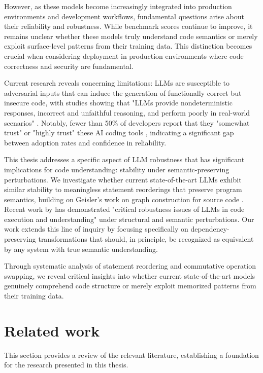\documentclass[%
thesis=student,%
coverpage=false,%
titlepage=false,%
headmarks=true, %
english,%
font=libertine, %
math=newpxtx, %
BCOR=5mm,%
coverBCOR=11mm%
]{tum-templates/book/tumbook}
\begin{document}
However, as these models become increasingly integrated into production environments and development workflows, fundamental questions arise about their reliability and robustness. While benchmark scores continue to improve, it remains unclear whether these models truly understand code semantics or merely exploit surface-level patterns from their training data. This distinction becomes crucial when considering deployment in production environments where code correctness and security are fundamental.

Current research reveals concerning limitations: LLMs are susceptible to adversarial inputs that can induce the generation of functionally correct but insecure code, with studies showing that "LLMs provide nondeterministic responses, incorrect and unfaithful reasoning, and perform poorly in real-world scenarios" \cite{Ullah2023}. Notably, fewer than 50\% of developers report that they "somewhat trust" or "highly trust" these AI coding tools \cite{France2024}, indicating a significant gap between adoption rates and confidence in reliability.

This thesis addresses a specific aspect of LLM robustness that has significant implications for code understanding: stability under semantic-preserving perturbations. We investigate whether current state-of-the-art LLMs exhibit similar stability to meaningless statement reorderings that preserve program semantics, building on Geisler's work on graph construction for source code \cite{Geisler2023}. Recent work by \textcite{Lam2024} has demonstrated "critical robustness issues of LLMs in code execution and understanding" under structural and semantic perturbations. Our work extends this line of inquiry by focusing specifically on dependency-preserving transformations that should, in principle, be recognized as equivalent by any system with true semantic understanding.

Through systematic analysis of statement reordering and commutative operation swapping, we reveal critical insights into whether current state-of-the-art models genuinely comprehend code structure or merely exploit memorized patterns from their training data. 


\section{Related work}
This section provides a review of the relevant literature, establishing a foundation for the research presented in this thesis.
\end{document}
